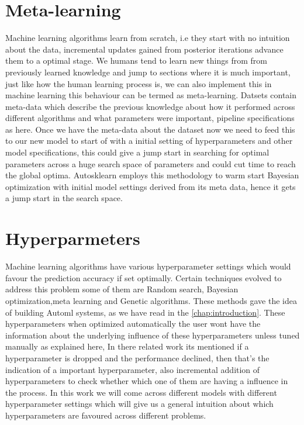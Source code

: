 \section{Meta-learning}
Machine learning algorithms learn from scratch, i.e they start with no intuition about the data, incremental updates gained from posterior iterations advance them to a optimal stage. We humans tend to learn new things from from previously learned knowledge and jump to sections where it is much important, just like how the human learning process is, we can also implement this in machine learning this behaviour can be termed as meta-learning. Datsets contain meta-data which describe the previous knowledge about how it performed across different algorithms and what parameters were important, pipeline specifications as here\cite{DBLP:journals/corr/abs-1810-03548}. Once we have the meta-data about the dataset now we need to feed this to our new model to start of with a initial setting of hyperparameters and other model specifications, this could give a jump start in searching for optimal parameters across a huge search space of parameters and could cut time to reach the global optima. Autosklearn employs this methodology 
to warm start Bayesian optimization with initial model settings derived from its meta data, hence it gets a jump start in the search space.

\section{Hyperparmeters}
Machine learning algorithms have various hyperparameter settings which would favour the prediction accuracy if set optimally. Certain techniques evolved to address this problem some of them are Random search, Bayesian optimization\cite{tut_bayesian},meta learning\cite{autosklearn} and Genetic algorithms\cite{tpot}. These methods gave the idea of building Automl systems, as we have read in the \ref{chap:introduction}. These hyperparameters when optimized automatically the user wont have the information about the underlying influence of these hyperparameters unless tuned manually as explained here\cite{hyperparameters}, In there related work its mentioned if a hyperparameter is dropped and the performance declined, then that's the indication of a important hyperparameter, also incremental addition of hyperparameters to check whether which one of them are having a influence in the process. In this work we will come across different models with different hyperparameter settings which will give us a general intuition about which hyperparameters are favoured across different problems.

